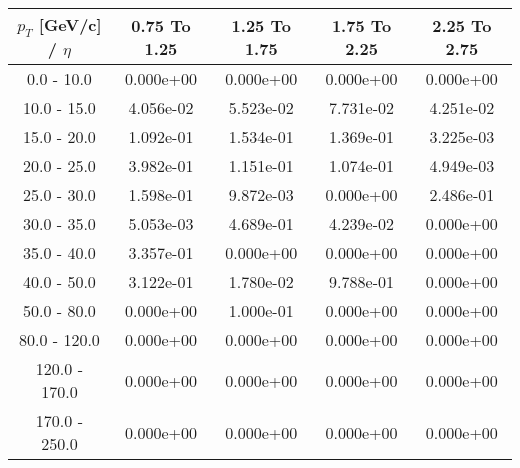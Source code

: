 \begin{tabular}{|c|c|c|c|c|}\hline 
$p_T$ [GeV/c] / $\eta$  & 0.75 To 1.25 & 1.25 To 1.75 & 1.75 To 2.25 & 2.25 To 2.75 \\ 
 \hline 
0.0 - 10.0 & 0.000e+00 & 0.000e+00 & 0.000e+00 & 0.000e+00 \\ 
10.0 - 15.0 & 4.056e-02 & 5.523e-02 & 7.731e-02 & 4.251e-02 \\ 
15.0 - 20.0 & 1.092e-01 & 1.534e-01 & 1.369e-01 & 3.225e-03 \\ 
20.0 - 25.0 & 3.982e-01 & 1.151e-01 & 1.074e-01 & 4.949e-03 \\ 
25.0 - 30.0 & 1.598e-01 & 9.872e-03 & 0.000e+00 & 2.486e-01 \\ 
30.0 - 35.0 & 5.053e-03 & 4.689e-01 & 4.239e-02 & 0.000e+00 \\ 
35.0 - 40.0 & 3.357e-01 & 0.000e+00 & 0.000e+00 & 0.000e+00 \\ 
40.0 - 50.0 & 3.122e-01 & 1.780e-02 & 9.788e-01 & 0.000e+00 \\ 
50.0 - 80.0 & 0.000e+00 & 1.000e-01 & 0.000e+00 & 0.000e+00 \\ 
80.0 - 120.0 & 0.000e+00 & 0.000e+00 & 0.000e+00 & 0.000e+00 \\ 
120.0 - 170.0 & 0.000e+00 & 0.000e+00 & 0.000e+00 & 0.000e+00 \\ 
170.0 - 250.0 & 0.000e+00 & 0.000e+00 & 0.000e+00 & 0.000e+00 \\ 
 \hline 
\end{tabular} 
